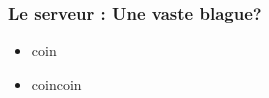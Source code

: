 \speaker{\Matthieu}
\begin{frame}
  \frametitle{Le serveur : Une vaste blague?}
  \begin{itemize}
    \item coin
    \item coincoin
  \end{itemize}
\end{frame}
